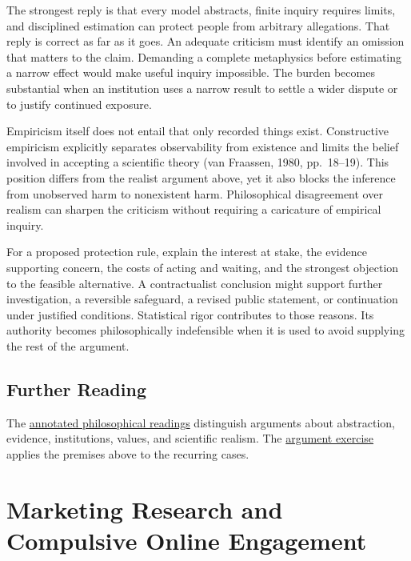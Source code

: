 The strongest reply is that every model abstracts, finite inquiry
requires limits, and disciplined estimation can protect people from
arbitrary allegations. That reply is correct as far as it goes. An
adequate criticism must identify an omission that matters to the claim.
Demanding a complete metaphysics before estimating a narrow effect would
make useful inquiry impossible. The burden becomes substantial when an
institution uses a narrow result to settle a wider dispute or to justify
continued exposure.

Empiricism itself does not entail that only recorded things exist.
Constructive empiricism explicitly separates observability from
existence and limits the belief involved in accepting a scientific
theory (van Fraassen, 1980, pp.~18--19). This position differs from the
realist argument above, yet it also blocks the inference from unobserved
harm to nonexistent harm. Philosophical disagreement over realism can
sharpen the criticism without requiring a caricature of empirical
inquiry.

For a proposed protection rule, explain the interest at stake, the
evidence supporting concern, the costs of acting and waiting, and the
strongest objection to the feasible alternative. A contractualist
conclusion might support further investigation, a reversible safeguard,
a revised public statement, or continuation under justified conditions.
Statistical rigor contributes to those reasons. Its authority becomes
philosophically indefensible when it is used to avoid supplying the rest
of the argument.

\hypertarget{M09-further-reading-2}{%
\subsection{Further Reading}\label{M09-further-reading-2}}

\noindent The
\href{../01_Resources/48_Statistical_Virtues_and_Ontology/README.md}{annotated
philosophical readings} distinguish arguments about abstraction,
evidence, institutions, values, and scientific realism. The
\href{../07_Labs/Philosophical_Arguments/README.md\#statistical-virtues-and-the-missing-object}{argument
exercise} applies the premises above to the recurring cases.


\hypertarget{M09-marketing-research-and-compulsive-online-engagement}{%
\section{Marketing Research and Compulsive Online
Engagement}\label{M09-marketing-research-and-compulsive-online-engagement}}

